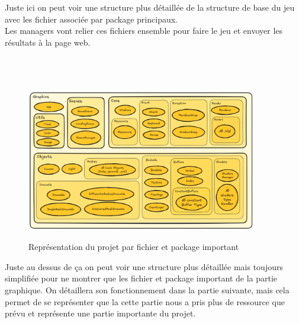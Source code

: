  \\ \\
Juste ici on peut voir une structure plus détaillée de la structure de base du jeu avec les fichier associée par package principaux. \\
Les managers vont relier ces fichiers ensemble pour faire le jeu et envoyer les résultats à la page web. \\ \\ \\ \\

\begin{figure}[h]
	\centering
	\includegraphics[width=0.9\textwidth]{images/ExcalidrawGraphics.png}
	\label{ExcalidrawGraphics}
	\caption{Représentation du projet par fichier et package important}
\end{figure}

Juste au dessus de ça on peut voir une structure plus détaillée mais toujours simplifiée pour ne montrer que les fichier et package important de la partie graphique. 
On détaillera son fonctionnement dans la partie suivante, mais cela permet de se représenter que la cette partie nous a pris plus de ressource que prévu et représente une partie importante du projet.



